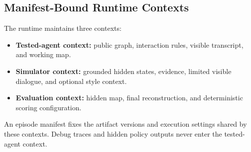\subsection{Manifest-Bound Runtime Contexts}

The runtime maintains three contexts:
\begin{itemize}[leftmargin=1.5em]
    \item \textbf{Tested-agent context:} public graph, interaction rules, visible transcript, and working map.
    \item \textbf{Simulator context:} grounded hidden states, evidence, limited visible dialogue, and optional style context.
    \item \textbf{Evaluation context:} hidden map, final reconstruction, and deterministic scoring configuration.
\end{itemize}

An episode manifest fixes the artifact versions and execution settings shared by these contexts. Debug traces and hidden policy outputs never enter the tested-agent context.
